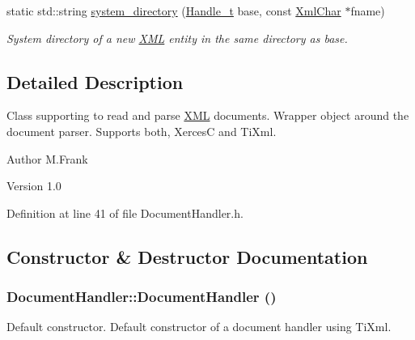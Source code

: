 \begin{DoxyCompactItemize}
static std::string \hyperlink{class_d_d4hep_1_1_x_m_l_1_1_document_handler_afcb87f1aa5a2dbd771990d4e2e36a3ed}{system\_\-directory} (\hyperlink{class_d_d4hep_1_1_x_m_l_1_1_handle__t}{Handle\_\-t} base, const \hyperlink{namespace_d_d4hep_1_1_x_m_l_a09e5d9cc86ed782f6826dfe0778c1815}{XmlChar} $\ast$fname)
\begin{DoxyCompactList}\small\item\em System directory of a new \hyperlink{namespace_d_d4hep_1_1_x_m_l}{XML} entity in the same directory as base. \item\end{DoxyCompactList}\end{DoxyCompactItemize}


\subsection{Detailed Description}
Class supporting to read and parse \hyperlink{namespace_d_d4hep_1_1_x_m_l}{XML} documents. Wrapper object around the document parser. Supports both, XercesC and TiXml.

\begin{DoxyAuthor}{Author}
M.Frank 
\end{DoxyAuthor}
\begin{DoxyVersion}{Version}
1.0 
\end{DoxyVersion}


Definition at line 41 of file DocumentHandler.h.

\subsection{Constructor \& Destructor Documentation}
\hypertarget{class_d_d4hep_1_1_x_m_l_1_1_document_handler_ac24bb98e06d7db2b0823816eec2f6c19}{
\subsubsection[{DocumentHandler}]{\setlength{\rightskip}{0pt plus 5cm}DocumentHandler::DocumentHandler ()}}
\label{class_d_d4hep_1_1_x_m_l_1_1_document_handler_ac24bb98e06d7db2b0823816eec2f6c19}


Default constructor. Default constructor of a document handler using TiXml. 

